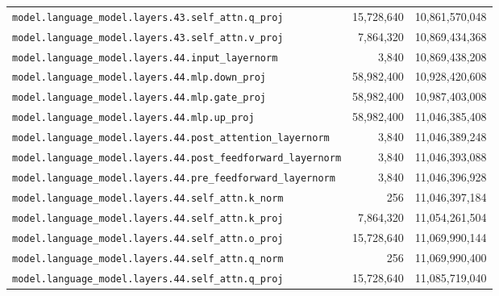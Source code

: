 \documentclass[10pt,a4paper]{article}
\theoremstyle{definition}
\begin{document}
\begin{appendices}
\begin{longtable}{p{9.5cm}rr}
\texttt{model.\allowbreak{}language\_model.\allowbreak{}layers.\allowbreak{}43.\allowbreak{}self\_attn.\allowbreak{}q\_proj} & 15,728,640 & 10,861,570,048 \\
\texttt{model.\allowbreak{}language\_model.\allowbreak{}layers.\allowbreak{}43.\allowbreak{}self\_attn.\allowbreak{}v\_proj} & 7,864,320 & 10,869,434,368 \\
\texttt{model.\allowbreak{}language\_model.\allowbreak{}layers.\allowbreak{}44.\allowbreak{}input\_layernorm} & 3,840 & 10,869,438,208 \\
\texttt{model.\allowbreak{}language\_model.\allowbreak{}layers.\allowbreak{}44.\allowbreak{}mlp.\allowbreak{}down\_proj} & 58,982,400 & 10,928,420,608 \\
\texttt{model.\allowbreak{}language\_model.\allowbreak{}layers.\allowbreak{}44.\allowbreak{}mlp.\allowbreak{}gate\_proj} & 58,982,400 & 10,987,403,008 \\
\texttt{model.\allowbreak{}language\_model.\allowbreak{}layers.\allowbreak{}44.\allowbreak{}mlp.\allowbreak{}up\_proj} & 58,982,400 & 11,046,385,408 \\
\texttt{model.\allowbreak{}language\_model.\allowbreak{}layers.\allowbreak{}44.\allowbreak{}post\_attention\_layernorm} & 3,840 & 11,046,389,248 \\
\texttt{model.\allowbreak{}language\_model.\allowbreak{}layers.\allowbreak{}44.\allowbreak{}post\_feedforward\_layernorm} & 3,840 & 11,046,393,088 \\
\texttt{model.\allowbreak{}language\_model.\allowbreak{}layers.\allowbreak{}44.\allowbreak{}pre\_feedforward\_layernorm} & 3,840 & 11,046,396,928 \\
\texttt{model.\allowbreak{}language\_model.\allowbreak{}layers.\allowbreak{}44.\allowbreak{}self\_attn.\allowbreak{}k\_norm} & 256 & 11,046,397,184 \\
\texttt{model.\allowbreak{}language\_model.\allowbreak{}layers.\allowbreak{}44.\allowbreak{}self\_attn.\allowbreak{}k\_proj} & 7,864,320 & 11,054,261,504 \\
\texttt{model.\allowbreak{}language\_model.\allowbreak{}layers.\allowbreak{}44.\allowbreak{}self\_attn.\allowbreak{}o\_proj} & 15,728,640 & 11,069,990,144 \\
\texttt{model.\allowbreak{}language\_model.\allowbreak{}layers.\allowbreak{}44.\allowbreak{}self\_attn.\allowbreak{}q\_norm} & 256 & 11,069,990,400 \\
\texttt{model.\allowbreak{}language\_model.\allowbreak{}layers.\allowbreak{}44.\allowbreak{}self\_attn.\allowbreak{}q\_proj} & 15,728,640 & 11,085,719,040 \\

\end{longtable}
\end{appendices}
\end{document}
